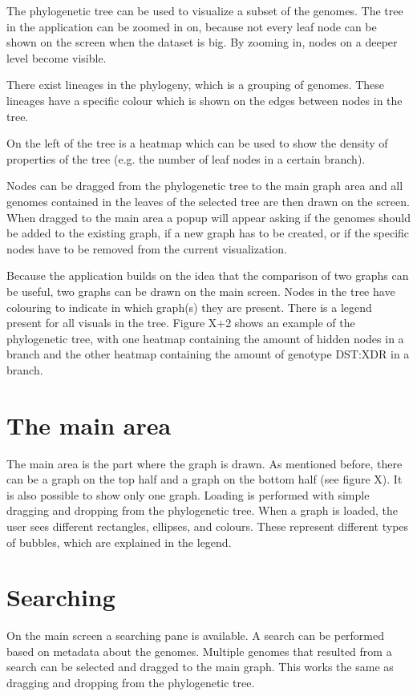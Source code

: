 The phylogenetic tree can be used to visualize a subset of the genomes. The tree in the application can be zoomed in on, because not every leaf node can be shown on the screen when the dataset is big. By zooming in, nodes on a deeper level become visible. 
\par
There exist lineages in the phylogeny, which is a grouping of genomes. These lineages have a specific colour which is shown on the edges between nodes in the tree. 
\par
On the left of the tree is a heatmap which can be used to show the density of properties of the tree (e.g. the number of leaf nodes in a certain branch). 
\par
Nodes can be dragged from the phylogenetic tree to the main graph area and all genomes contained in the leaves of the selected tree are then drawn on the screen. When dragged to the main area a popup will appear asking if the genomes should be added to the existing graph, if a new graph has to be created, or if the specific nodes have to be removed from the current visualization. 
\par
Because the application builds on the idea that the comparison of two graphs can be useful, two graphs can be drawn on the main screen. Nodes in the tree have colouring to indicate in which graph(s) they are present. There is a legend present for all visuals in the tree. 
Figure X+2 shows an example of the phylogenetic tree, with one heatmap containing the amount of hidden nodes in a branch and the other heatmap containing the amount of genotype DST:XDR in a branch.
\section{The main area}
The main area is the part where the graph is drawn. As mentioned before, there can be a graph on the top half and a graph on the bottom half (see figure X). It is also possible to show only one graph. Loading is performed with simple dragging and dropping from the phylogenetic tree. When a graph is loaded, the user sees different rectangles, ellipses, and colours. These represent different types of bubbles, which are explained in the legend. 
\section{Searching}
On the main screen a searching pane is available. A search can be performed based on metadata about the genomes. Multiple genomes that resulted from a search can be selected and dragged to the main graph. This works the same as dragging and dropping from the phylogenetic tree.
